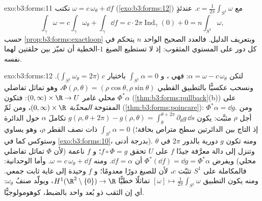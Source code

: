 \begin{solution}{exo:b3:forms:11}
نكتب $\omega = c\,\omega_\theta + \dd f$ (\cref{exo:b3:forms:12}) مع $c =
\frac1{2\pi}\int_{S^1}\omega$. عندئذٍ
\[
\int_\gamma\omega = c\int_\gamma\omega_\theta +
\int_\gamma\dd f
= c\cdot2\pi\operatorname{Ind}_\gamma(0) + 0
= n\int_{S^1}\omega,
\]
حسب \cref{prop:b3:forms:exactloop} وبتعريف الدليل. فالعدد الصحيح الواحد $n$
يتحكم في كل دور على المستوي المثقوب: إذ لا تستطيع الصيغ
$1$-الخطية  أن تميّز بين حلقتين لهما  نفسه.
\end{solution}

\begin{solution}{exo:b3:forms:12}
لتكن $\alpha = \omega - c\,\omega_\theta$: فهي ، و $\int_{S^1}\alpha = 0$ باختيار $c$ ($\int_{S^1}\omega_\theta = 2\pi$). ونسحب
عكسيًّا بالتطبيق القطبي $\Phi(\rho, \theta) = (\rho\cos\theta, \rho\sin\theta)$، وهو تماثل تفاضلي محلي غامر
$(0, \infty)\times\R \to
U$: فتكون $\Phi^*\alpha$  (\cref{thm:b3:forms:pullback}(b)) على
المفتوحة \emph{المحدّبة} $(0,\infty)\times\R$، ومن ثَمّ  (\cref{thm:b3:forms:poincare}):
$\Phi^*\alpha = \dd g$. ومن أجل $\rho$ مثبَّت: يكون $g(\rho, \theta + 2\pi) - g(\rho, \theta)
= \int_\theta^{\theta + 2\pi}\partial_\theta g\,\dd s$ تكاملَ $\alpha$
حول الدائرة ذات نصف القطر $\rho$، وهو يساوي $\int_{S^1}\alpha = 0$ (إذ التاج
بين الدائرتين سطح متراص بحافة؛ وستوكس كما في \cref{exo:b3:forms:10}،
بدرجة أدنى). ومنه تكون $g$ دورية بالدور $2\pi$ في $\theta$
وتنزل إلى دالة معرَّفة جيدًا $f$ على $U$ تحقق $f\circ\Phi = g$؛
و $f$ ناعمة (لأن $\Phi$ تماثل تفاضلي محلي) ويفرض $\Phi^*(\dd f) = \dd g = \Phi^*\alpha$ أن
$\dd f =
\alpha$. ومنه $\omega = c\,\omega_\theta + \dd f$. وأما الوحدانية: فالمكاملة على $S^1$
تثبّت $c$، لأن للصيغ  دورًا معدومًا؛ و $f$ وحيدة إلى غاية
ثابت جمعي. ومنه يكون التطبيق $[\omega] \mapsto
\frac1{2\pi}\int_{S^1}\omega$ تماثلًا خطيًّا $H^1(\R^2\setminus\{0\}) \to \R$،
ويولّد صنفُ $\omega_\theta$: أي إن الثقب ذو بُعد واحد بالضبط،
كوهومولوجيًّا.
\end{solution}

